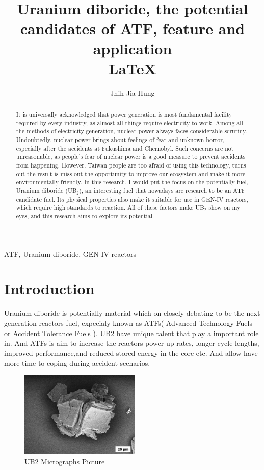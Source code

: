 \documentclass[final,10pt,times,twocolumn]{elsarticle}
\author{Jhih-Jia Hung}
\begin{document}
\begin{frontmatter}
\title{Uranium diboride, the potential candidates of ATF, feature and application \\ \LaTeX}
\begin{abstract}
It is universally acknowledged that power generation is most fundamental facility required by every industry, as almost all things require electricity to work. Among all the methods of electricity generation, nuclear power always faces considerable scrutiny. Undoubtedly, nuclear power brings about feelings of fear and unknown horror, especially after the accidents at Fukushima and Chernobyl. Such concerns are not unreasonable, as people's fear of nuclear power is a good measure to prevent accidents from happening. However, Taiwan people are too afraid of using this technology, turns out the result is miss out the opportunity to improve our ecosystem and make it more environmentally friendly. In this research, I would put the focus on the potentially fuel, Uranium diboride (UB$_{2}$), an interesting fuel that nowadays are research to be an ATF candidate fuel. Its physical properties also make it suitable for use in GEN-IV reactors, which require high standards to reaction. All of these factors make UB$_{2}$ show on my eyes, and this research aims to explore its potential.
\end{abstract}

\begin{keyword}
ATF, Uranium diboride, GEN-IV reactors
\end{keyword}

\end{frontmatter}

\section{Introduction}
Uranium diboride is potentially material which on closely debating to be the next generation reactors fuel, expecialy known as ATFs( Advanced Technology Fuels or Accident Tolerance Fuels ). UB2 have unique talent that play a important role in. And ATFs is aim to increase the reactors power up-rates, longer cycle lengths, improved performance,and reduced stored energy in the core etc. And allow have more time to coping during accident scenarios.\cite{watkins2022challenges}

\begin{figure}[ht]
    \centering
    \includegraphics[width = 5.75cm]{UB2 Micrographs.png}
    \caption{UB2 Micrographs Picture\cite{watkins2022challenges} }
\end{figure}
\end{document}
